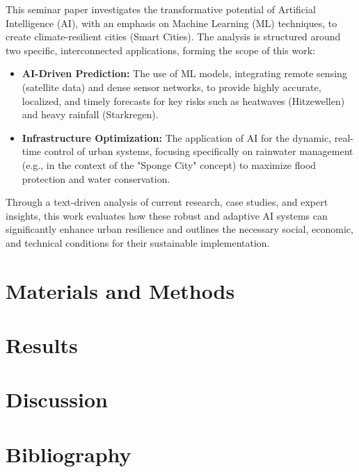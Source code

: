 \documentclass[12pt]{article}
\begin{document}
This seminar paper investigates the transformative potential of Artificial Intelligence (AI), with an 
emphasis on Machine Learning (ML) techniques, to create climate-resilient cities (Smart Cities). The analysis is 
structured around two specific, interconnected applications, forming the scope of this work:
\begin{itemize}
    \item \textbf{AI-Driven Prediction:} The use of ML models, integrating remote sensing (satellite data) and dense sensor networks,
to provide highly accurate, localized, and timely forecasts for key risks such as heatwaves (Hitzewellen) and heavy 
rainfall (Starkregen).

    \item \textbf{Infrastructure Optimization:} The application of AI for the dynamic, real-time control of urban systems, focusing
specifically on rainwater management (e.g., in the context of the "Sponge City" concept) to maximize flood protection
and water conservation.
\end{itemize} 
Through a text-driven analysis of current research, case studies, and expert insights, this work evaluates how these 
robust and adaptive AI systems can significantly enhance urban resilience and outlines the necessary social, economic, 
and technical conditions for their sustainable implementation.
\section{Materials and Methods}
\lipsum[4-5]  %

\section{Results}
\lipsum[6-7]  %

\section{Discussion}
\lipsum[8-9]  %

\section{Bibliography}
\printbibliography[heading=none]

\end{document}
